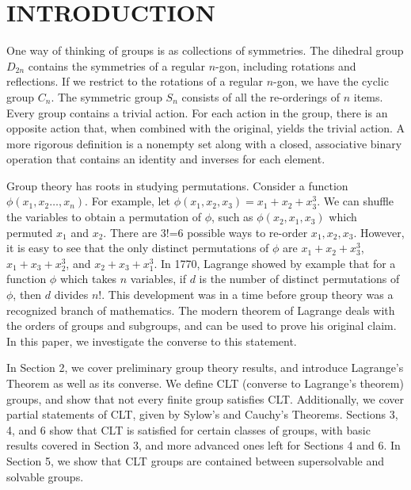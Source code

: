 \documentclass[12pt]{report}
\theoremstyle{newthm}
\begin{document}
 

 
\linespread{2}
\section{INTRODUCTION}
\par One way of thinking of groups is as collections of symmetries. The dihedral group $D_{2n}$ contains the symmetries of a regular $n$-gon, including rotations and reflections. If we restrict to the rotations of a regular $n$-gon, we have the cyclic group $C_n$. The symmetric group $S_n$ consists of all the re-orderings of $n$ items. Every group contains a trivial action. For each action in the group, there is an opposite action that, when combined with the original, yields the trivial action. A more rigorous definition is a nonempty set along with a closed, associative binary operation that contains an identity and inverses for each element.
\par Group theory has roots in studying permutations. Consider a function\\ \noindent$\phi(x_1, x_2\dotsc,x_n)$. For example, let $\phi(x_1,x_2,x_3) = x_1+x_2+x_3^3$. We can shuffle the variables to obtain a permutation of $\phi$, such as $\phi(x_2,x_1,x_3)$ which permuted $x_1$ and $x_2$. There are 3!=6 possible ways to re-order $x_1,x_2,x_3$. However, it is easy to see that the only distinct permutations of $\phi$ are $x_1+x_2+x_3^3$, $x_1+x_3+x_2^3$, and $x_2+x_3+x_1^3$. In 1770, Lagrange showed by example that for a function $\phi$ which takes $n$ variables, if $d$ is the number of distinct permutations of $\phi$, then $d$ divides $n!$. This development was in a time before group theory was a recognized branch of mathematics. The modern theorem of Lagrange deals with the orders of groups and subgroups, and can be used to prove his original claim. In this paper, we investigate the converse to this statement.
\par In Section 2, we cover preliminary group theory results, and introduce Lagrange's Theorem as well as its converse. We define CLT (converse to Lagrange's theorem) groups, and show that not every finite group satisfies CLT. Additionally, we cover partial statements of CLT, given by Sylow's and Cauchy's Theorems. Sections 3, 4, and 6 show that CLT is satisfied for certain classes of groups, with basic results covered in Section 3, and more advanced ones left for Sections 4 and 6. In Section 5, we show that CLT groups are contained between supersolvable and solvable groups.
\newpage
\end{document}
